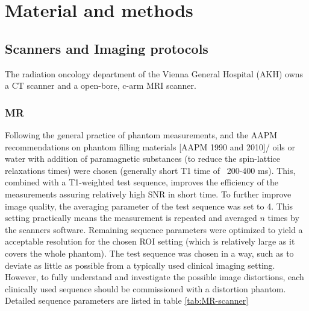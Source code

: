 

\chapter{Material and methods}


\section{Scanners and Imaging protocols}

The radiation oncology department of the Vienna General Hospital (AKH) owns a CT scanner and a open-bore, c-arm MRI scanner.

\subsection{MR}

Following the general practice of phantom measurements, and the AAPM recommendations on phantom filling materials [AAPM 1990 and 2010]/ \cite{Jackson2009} oils or water with addition of paramagnetic substances (to reduce the spin-lattice relaxations times) were chosen (generally short T1 time of ~200-400 ms).
This, combined with a T1-weighted test sequence, improves the efficiency of the measurements assuring relatively high SNR in short time.
To further improve image quality, the averaging parameter of the test sequence was set to 4.
This setting practically means the measurement is repeated and averaged $n$ times by the scanners software.
Remaining sequence parameters were optimized to yield a acceptable resolution for the chosen ROI setting (which is relatively large as it covers the whole phantom).
The test sequence was chosen in a way, such as to deviate as little as possible from a typically used clinical imaging setting.
However, to fully understand and investigate the possible image distortions, each clinically used sequence should be commissioned with a distortion phantom.
Detailed sequence parameters are listed in table \ref{tab:MR-scanner}


